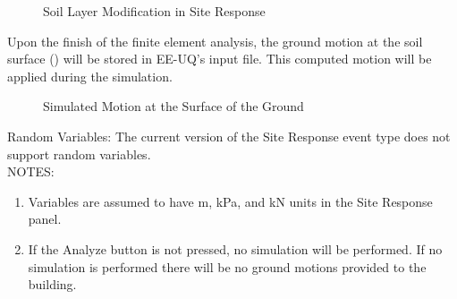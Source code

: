\begin{figure}[!htbp]
  \caption{Soil Layer Modification in Site Response }
  \label{fig:s3hark3}
\end{figure}

Upon the finish of the finite element analysis, the ground motion at the soil surface () will be stored in EE-UQ's input file.
This computed motion will be applied during the simulation.

\begin{figure}[!htbp]
  \caption{Simulated Motion at the Surface of the Ground}
  \label{fig:s3hark4}
\end{figure}

Random Variables: The current version of the Site Response event type does not support random variables.\\

NOTES: 
\begin{enumerate}
\item Variables are assumed to have m, kPa, and kN units in the Site Response panel.
\item If the Analyze button is not pressed, no simulation will be performed. If no simulation is performed there will be no ground motions provided to the building.
\end{enumerate}
